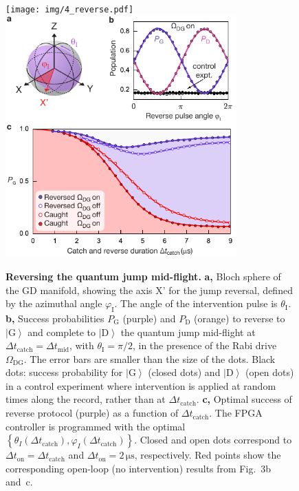 \documentclass[
	 			preprint,     		superscriptaddress, 																longbibliography,
		amsmath, amssymb,
		aps,  prb,   		floatfix,
		linenumbers     
	]{revtex4-1}
\newcommand{\ket}[1]{\left|#1\right>}
\begin{document}
\begin{figure}
\begin{centering}
\ifjournal
	\texttt{[image: img/4\_reverse.pdf]}
\else
	\includegraphics[width=89mm]{4_reverse.pdf}
\fi
\caption{
\label{fig:reverse} 
\label{fig:Reversing-the-quantum}
\textbf{Reversing the quantum jump mid-flight.}
\textbf{a,} Bloch sphere of the GD manifold, showing the axis X' for the jump reversal, defined by the azimuthal angle $\varphi_\mathrm{I}$. The angle of the intervention pulse is $\theta_\mathrm{I}$.
\textbf{b,} 
Success probabilities $P_\mathrm G$ (purple) and $P_\mathrm D$ (orange) to reverse to $\ket{\mathrm G}$ and complete to $\ket{\mathrm D}$ the quantum jump mid-flight at $\Delta t_{\mathrm{catch}} = \Delta t_{\mathrm{mid}}$, with $\theta_\mathrm I = \pi/2$, in the presence of the Rabi drive $\Omega_\mathrm{DG}$.
The error bars are smaller than the size of the dots.
Black dots:  success probability for $\ket{\mathrm G}$ (closed dots) and $\ket{\mathrm D}$ (open dots) in a control experiment where intervention is applied at random times along the record, rather than at  $\Delta t_{\mathrm{catch}}$.
\textbf{c,}
Optimal success of reverse protocol (purple) as a function of $\Delta t_{\mathrm{catch}}$.  The FPGA controller is programmed with the optimal $\left\{\theta_{I}\left(\Delta t_{\mathrm{catch}}\right),\varphi_{I}\left(\Delta t_{\mathrm{catch}}\right)\right\}$.
Closed and open dots correspond to $\Delta t_\mathrm{on} = \Delta t_\mathrm{catch} $ and  $\Delta t_\mathrm{on} = 2\,\mathrm{\mu s} $, respectively. 
Red points show the corresponding open-loop (no intervention) results from Fig.~3b and~c. 
}
\end{centering}
\end{figure}
\end{document}

